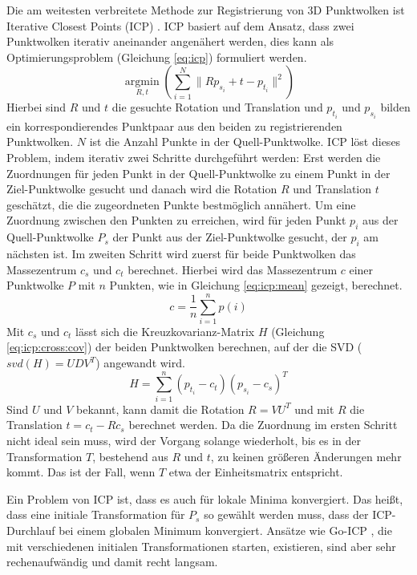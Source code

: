 \documentclass[12pt,titlepage, twoside]{article}
\begin{document}
Die am weitesten verbreitete Methode zur Registrierung von 3D Punktwolken ist Iterative Closest Points (ICP) \cite{icp_org}. 
ICP basiert auf dem Ansatz, dass zwei Punktwolken iterativ aneinander angenähert werden, dies kann als Optimierungsproblem (Gleichung \ref{eq:icp}) formuliert werden.
\begin{equation}
    \label{eq:icp}
    \underset{R,t}{\operatorname{argmin}}(\sum_{i=1}^N{\|Rp_{s_i} + t - p_{t_i}\|^2})
\end{equation}
Hierbei sind $R$ und $t$ die gesuchte Rotation und Translation und $p_{t_i}$ und $p_{s_i}$ bilden ein korrespondierendes Punktpaar aus den beiden zu registrierenden Punktwolken. 
$N$ ist die Anzahl Punkte in der Quell-Punktwolke.
ICP löst dieses Problem, indem iterativ zwei Schritte durchgeführt werden: 
Erst werden die Zuordnungen für jeden Punkt in der Quell-Punktwolke zu einem Punkt in der Ziel-Punktwolke gesucht und danach wird die Rotation $R$ und Translation $t$ geschätzt, die die zugeordneten Punkte bestmöglich annähert.
Um eine Zuordnung zwischen den Punkten zu erreichen, wird für jeden Punkt $p_i$ aus der Quell-Punktwolke $P_s$ der Punkt aus der Ziel-Punktwolke gesucht, der $p_i$ am nächsten ist. 
Im zweiten Schritt wird zuerst für beide Punktwolken das Massezentrum $c_s$ und $c_t$ berechnet. Hierbei wird das Massezentrum $c$ einer Punktwolke $P$ mit $n$ Punkten, wie in Gleichung \ref{eq:icp:mean} gezeigt, berechnet.
\begin{equation}
    \label{eq:icp:mean}
    c = \frac{1}{n}\sum_{i=1}^n{p(i)}
\end{equation}
Mit $c_s$ und $c_t$ lässt sich die Kreuzkovarianz-Matrix $H$ (Gleichung \ref{eq:icp:cross:cov}) der beiden Punktwolken berechnen, auf der die SVD ($svd(H) = UDV^T$) angewandt wird.
\begin{equation}
    \label{eq:icp:cross:cov}
    H = \sum_{i=1}^n{(p_{t_i} - c_t)(p_{s_i} - c_s)^T}
\end{equation}
Sind $U$ und $V$ bekannt, kann damit die Rotation $R = VU^T$ und mit $R$ die Translation $t=c_t-Rc_s$ berechnet werden.
Da die Zuordnung im ersten Schritt nicht ideal sein muss, wird der Vorgang solange wiederholt, bis es in der Transformation $T$, bestehend aus $R$ und $t$, zu keinen größeren Änderungen mehr kommt.
Das ist der Fall, wenn $T$ etwa der Einheitsmatrix entspricht.

Ein Problem von ICP ist, dass es auch für lokale Minima konvergiert. Das heißt, dass eine initiale Transformation für $P_s$ so gewählt werden muss, dass der ICP-Durchlauf bei einem globalen Minimum konvergiert.
Ansätze wie Go-ICP \cite{GoICP}, die mit verschiedenen initialen Transformationen starten, existieren, sind aber sehr rechenaufwändig und damit recht langsam.
\end{document}
